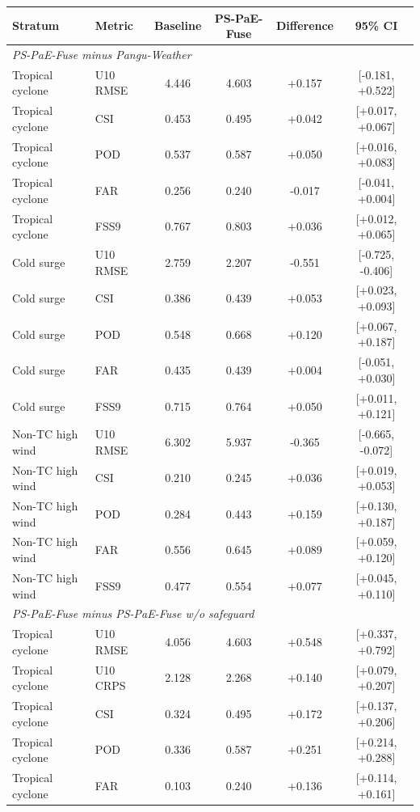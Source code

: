 \begin{tabular}{llcccc}
\hline
Stratum & Metric & Baseline & PS-PaE-Fuse & Difference & 95\% CI \\
\hline
\multicolumn{6}{l}{\textit{PS-PaE-Fuse minus Pangu-Weather}} \\
Tropical cyclone & U10 RMSE & 4.446 & 4.603 & +0.157 & [-0.181, +0.522] \\
Tropical cyclone & CSI & 0.453 & 0.495 & +0.042 & [+0.017, +0.067] \\
Tropical cyclone & POD & 0.537 & 0.587 & +0.050 & [+0.016, +0.083] \\
Tropical cyclone & FAR & 0.256 & 0.240 & -0.017 & [-0.041, +0.004] \\
Tropical cyclone & FSS9 & 0.767 & 0.803 & +0.036 & [+0.012, +0.065] \\
Cold surge & U10 RMSE & 2.759 & 2.207 & -0.551 & [-0.725, -0.406] \\
Cold surge & CSI & 0.386 & 0.439 & +0.053 & [+0.023, +0.093] \\
Cold surge & POD & 0.548 & 0.668 & +0.120 & [+0.067, +0.187] \\
Cold surge & FAR & 0.435 & 0.439 & +0.004 & [-0.051, +0.030] \\
Cold surge & FSS9 & 0.715 & 0.764 & +0.050 & [+0.011, +0.121] \\
Non-TC high wind & U10 RMSE & 6.302 & 5.937 & -0.365 & [-0.665, -0.072] \\
Non-TC high wind & CSI & 0.210 & 0.245 & +0.036 & [+0.019, +0.053] \\
Non-TC high wind & POD & 0.284 & 0.443 & +0.159 & [+0.130, +0.187] \\
Non-TC high wind & FAR & 0.556 & 0.645 & +0.089 & [+0.059, +0.120] \\
Non-TC high wind & FSS9 & 0.477 & 0.554 & +0.077 & [+0.045, +0.110] \\
\multicolumn{6}{l}{\textit{PS-PaE-Fuse minus PS-PaE-Fuse w/o safeguard}} \\
Tropical cyclone & U10 RMSE & 4.056 & 4.603 & +0.548 & [+0.337, +0.792] \\
Tropical cyclone & U10 CRPS & 2.128 & 2.268 & +0.140 & [+0.079, +0.207] \\
Tropical cyclone & CSI & 0.324 & 0.495 & +0.172 & [+0.137, +0.206] \\
Tropical cyclone & POD & 0.336 & 0.587 & +0.251 & [+0.214, +0.288] \\
Tropical cyclone & FAR & 0.103 & 0.240 & +0.136 & [+0.114, +0.161] \\

\end{tabular}
